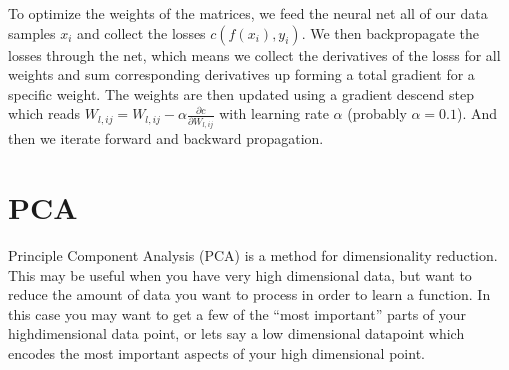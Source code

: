 \documentclass[12pt]{article}
\newcommand{\der}{\partial}
\newcommand{\deriv}[2]{\frac{\der #1}{\der #2}}
\begin{document}
To optimize the weights of the matrices, we feed the neural net all of our data samples $x_i$ and collect the losses $c(f(x_i),y_i)$.
We then backpropagate the losses through the net, which means we collect the derivatives of the losss for all weights and sum corresponding derivatives up forming a total gradient for a specific weight.
The weights are then updated using a gradient descend step which reads $W_{l,ij} = W_{l,ij} - \alpha \deriv{c}{W_{l,ij}}$ with learning rate $\alpha$ (probably $\alpha=0.1$).
And then we iterate forward and backward propagation.


\section{PCA}
Principle Component Analysis (PCA) is a method for dimensionality reduction.
This may be useful when you have very high dimensional data, but want to reduce the amount of data you want to process in order to learn a function.
In this case you may want to get a few of the \enquote{most important} parts of your highdimensional data point, or lets say a low dimensional datapoint which encodes the most important aspects of your high dimensional point.
\end{document}
